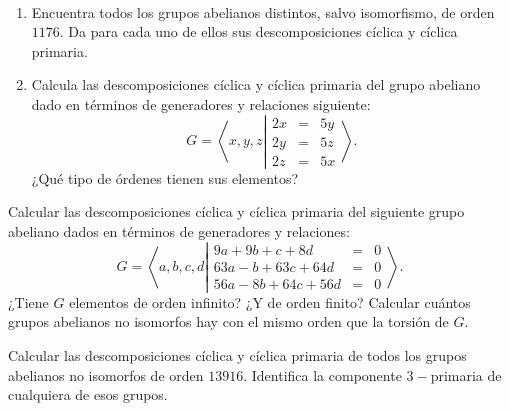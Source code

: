 \begin{ejercicio}\label{ej:7.13}~
    \begin{enumerate}
        \item Encuentra todos los grupos abelianos distintos, salvo isomorfismo, de orden $1176$. Da para cada uno de ellos sus descomposiciones cíclica y cíclica primaria.
        \item Calcula las descomposiciones cíclica y cíclica primaria del grupo abeliano dado en términos de generadores y relaciones siguiente:
        \begin{equation*}
            G = \left\langle x, y, z \left|
                \begin{array}{rcl}
                    2x &=& 5y \\
                    2y &=& 5z \\
                    2z &=& 5x
                \end{array}
            \right.\right\rangle.
        \end{equation*}
        ¿Qué tipo de órdenes tienen sus elementos?
    \end{enumerate}
\end{ejercicio}

\begin{ejercicio}\label{ej:7.14}
    Calcular las descomposiciones cíclica y cíclica primaria del siguiente grupo abeliano dados en términos de generadores y relaciones:
    \begin{equation*}
        G = \left\langle a, b, c, d \left|
            \begin{array}{rcl}
                9a + 9b + c + 8d &=& 0 \\
                63a - b + 63c + 64d &=& 0 \\
                56a - 8b + 64c + 56d &=& 0
            \end{array}
        \right.\right\rangle.
    \end{equation*}
    ¿Tiene $G$ elementos de orden infinito? ¿Y de orden finito? Calcular cuántos grupos abelianos no isomorfos hay con el mismo orden que la torsión de $G$.
\end{ejercicio}

\begin{ejercicio}\label{ej:7.15}
    Calcular las descomposiciones cíclica y cíclica primaria de todos los grupos abelianos no isomorfos de orden $13916$. Identifica la componente $3-$primaria de cualquiera de esos grupos.
\end{ejercicio}
